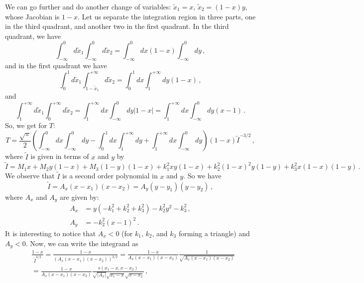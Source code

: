 \documentclass[twoside]{article}
\begin{document}
We can go further and do another change of variables: $\tilde{x}_1 = x$, $\tilde{x}_2 = (1-x)y$, whose Jacobian is $1-x$.
Let us separate the integration region in three parts, one in the third quadrant, and another two in the first quadrant.
In the third quadrant, we have
\begin{equation}
\int_{-\infty}^0 d\tilde{x}_1 \int_{-\infty}^0 d\tilde{x}_2 = \int_{-\infty}^0 dx (1-x)\int_{-\infty}^0 dy  \,,
\end{equation}
and in the first quadrant we have
\begin{equation}
\int_0^1 d\tilde{x}_1 \int_{1-\tilde{x}_1}^{+\infty} d\tilde{x}_2 = \int_0^1 dx \int_1^{+\infty} dy (1-x) \,,
\end{equation}
and
\begin{equation}
\int_1^{+\infty} d\tilde{x}_1 \int_{0}^{+\infty} d\tilde{x}_2 = \int_1^{+\infty} dx \int_{-\infty}^0 dy |1-x| = \int_1^{+\infty} dx \int_{-\infty}^0 dy (x-1) \,.
\end{equation} 
So, we get for $T$:
\begin{equation}
\label{eq:Tdiff}
T =  \frac{\sqrt{\pi}}{2}\left(\int_{-\infty}^0 dx \int_{-\infty}^0 dy 
-\int_0^1 dx \int_{1}^{+\infty}dy
+ \int_{1}^{+\infty} dx \int_{-\infty}^{0}dy\right) (1-x)\tilde{I}^{-3/2}\,, 
\end{equation}
where $\tilde{I}$ is given in terms of $x$ and $y$ by
\begin{equation}
\tilde{I} = M_1 x +  M_2 y (1-x) + M_3 (1-y) (1-x) + k^2_1 x y (1-x) + k^2_2 (1-x)^2 y (1-y) + k^2_3 x (1-x)(1-y) \,.
\end{equation}
We observe that $\tilde{I}$ is a second order polynomial in $x$ and $y$. So we have
\begin{equation}
\label{eq:Ay}
\tilde{I} = A_x (x-x_1)(x-x_2) = A_y (y-y_1)(y-y_2)\,,
\end{equation}
where $A_x$ and $A_y$ are given by:
\begin{align}
A_x &= y (-k_1^2+k_2^2+k_3^2)- k_2^2 y^2-k_3^2\,,\\
A_y &= -k_2^2 (x-1)^2\,.
\end{align}
It is interesting to notice that $A_x<0$ (for $k_1$, $k_2$, and $k_3$ forming a triangle) and $A_y<0$.
Now, we can write the integrand as
\begin{equation}
\begin{split}
&\frac{1-x}{\tilde{I}^{3/2}}=\frac{1-x}{(A_x (x-x_1)(x-x_2))^{3/2}}=\frac{1-x}{A_x (x-x_1)(x-x_2)}\frac{1}{\sqrt{A_x (x-x_1)(x-x_2)}}\\
&=\frac{1-x}{A_x (x-x_1)(x-x_2)}\frac{s(x_1-x,x-x_2)}{\sqrt{|A_x|}\sqrt{x_1-x}\sqrt{x-x_2}}\,,
\end{split}
\end{equation}
\end{document}
